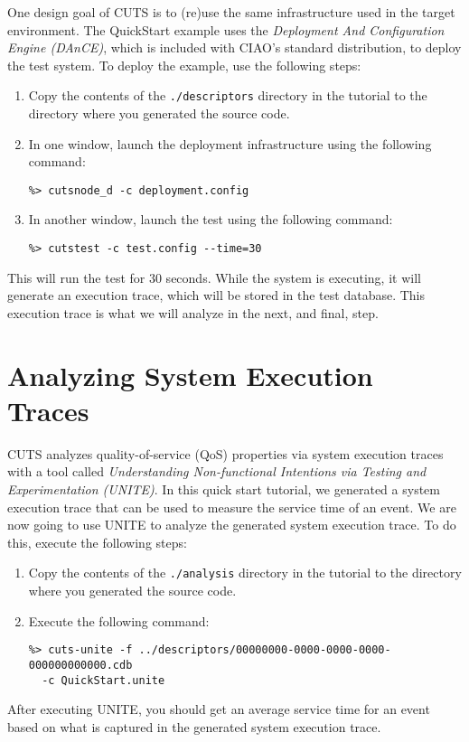 One design goal of CUTS is to (re)use the same infrastructure 
used in the target environment. The QuickStart example uses 
the \textit{Deployment And Configuration Engine (DAnCE)}, which 
is included with CIAO's standard distribution, to deploy the 
test system. To deploy the example, use the following steps:
\begin{enumerate}
  \item Copy the contents of the \texttt{./descriptors} directory 
  in the tutorial to the directory where you generated the source 
  code.
  
  \item In one window, launch the deployment infrastructure using 
  the following command:
\begin{lstlisting}
%> cutsnode_d -c deployment.config
\end{lstlisting}
  
  \item  In another window, launch the test using the following 
  command:
\begin{lstlisting}
%> cutstest -c test.config --time=30
\end{lstlisting}

\end{enumerate}

This will run the test for 30 seconds. While the system is executing, 
it will generate an execution trace, which will be stored in the 
test database. This execution trace is what we will analyze in the 
next, and final, step.

\section{Analyzing System Execution Traces}
\label{sec:tutorial-analysis}

CUTS analyzes quality-of-service (QoS) properties via system execution
traces with a tool called \textit{Understanding Non-functional Intentions 
 via Testing and Experimentation (UNITE)}. In this quick start tutorial, 
we generated a system execution trace that can be used to measure the 
service time of an event. We are now going to use UNITE to analyze 
the generated system execution trace. To do this, execute the following 
steps:
\begin{enumerate}
  \item Copy the contents of the \texttt{./analysis} directory in the 
  tutorial to the directory where you generated the source code.
  
  \item Execute the following command:
\begin{lstlisting}
%> cuts-unite -f ../descriptors/00000000-0000-0000-0000-000000000000.cdb 
  -c QuickStart.unite
  \end{lstlisting}
\end{enumerate}

After executing UNITE, you should get an average service time for an 
event based on what is captured in the generated system execution 
trace.

